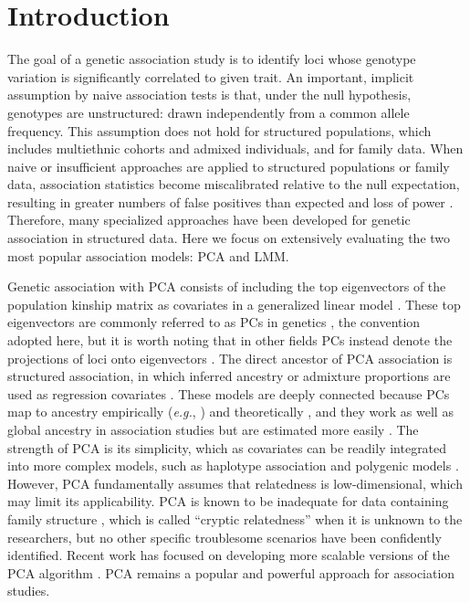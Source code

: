 \documentclass[11pt]{article}
\begin{document}
\section{Introduction} 

The goal of a genetic association study is to identify loci whose genotype variation is significantly correlated to given trait.
An important, implicit assumption by naive association tests is that, under the null hypothesis, genotypes are unstructured: drawn independently from a common allele frequency.
This assumption does not hold for structured populations, which includes multiethnic cohorts and admixed individuals, and for family data.
When naive or insufficient approaches are applied to structured populations or family data, association statistics become miscalibrated relative to the null expectation, resulting in greater numbers of false positives than expected and loss of power \citep{devlin_genomic_1999, voight_confounding_2005, astle_population_2009}.
Therefore, many specialized approaches have been developed for genetic association in structured data.
Here we focus on extensively evaluating the two most popular association models: PCA and LMM.

Genetic association with PCA consists of including the top eigenvectors of the population kinship matrix as covariates in a generalized linear model \citep{zhang_semiparametric_2003, price_principal_2006, bouaziz_accounting_2011}.
These top eigenvectors are commonly referred to as PCs in genetics \citep{patterson_population_2006}, the convention adopted here, but it is worth noting that in other fields PCs instead denote the projections of loci onto eigenvectors \citep{jolliffe_principal_2002}.
The direct ancestor of PCA association is structured association, in which inferred ancestry or admixture proportions are used as regression covariates \citep{pritchard_association_2000}.
These models are deeply connected because PCs map to ancestry empirically (\textit{e.g.}, \cite{alexander_fast_2009, zhou_strong_2016}) and theoretically \citep{mcvean_genealogical_2009,zheng_eigenanalysis_2016,cabreros_likelihood-free_2019}, and they work as well as global ancestry in association studies but are estimated more easily \citep{patterson_population_2006, zhao_arabidopsis_2007, alexander_fast_2009, bouaziz_accounting_2011}.
The strength of PCA is its simplicity, which as covariates can be readily integrated into more complex models, such as haplotype association \citep{xu_detecting_2014} and polygenic models \citep{qian_fast_2020}.
However, PCA fundamentally assumes that relatedness is low-dimensional, which may limit its applicability.
PCA is known to be inadequate for data containing family structure \citep{patterson_population_2006, thornton_roadtrips:_2010, price_new_2010}, which is called ``cryptic relatedness'' when it is unknown to the researchers, but no other specific troublesome scenarios have been confidently identified.
Recent work has focused on developing more scalable versions of the PCA algorithm \citep{lee_sparse_2012, abraham_fast_2014, galinsky_fast_2016, abraham_flashpca2:_2017, agrawal_scalable_2020}.
PCA remains a popular and powerful approach for association studies.
\end{document}
